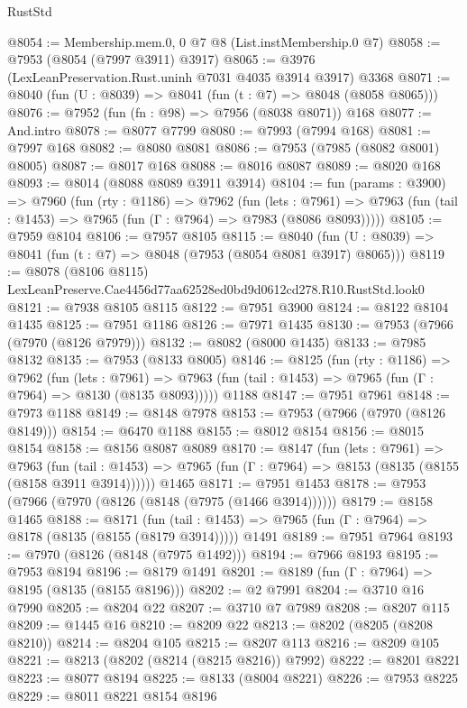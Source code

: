 \begin{lexlean}{RustStd}
\begin{coremodule}
@8054 := Membership.mem.{0, 0} @7 @8 (List.instMembership.{0} @7)
@8058 := @7953 (@8054 (@7997 @3911) @3917)
@8065 := @3976 (LexLeanPreservation.Rust.uninh @7031 @4035 @3914 @3917) @3368
@8071 := @8040 (fun (U : @8039) => @8041 (fun (t : @7) => @8048 (@8058 @8065)))
@8076 := @7952 (fun (fn : @98) => @7956 (@8038 @8071)) @168
@8077 := And.intro
@8078 := @8077 @7799
@8080 := @7993 (@7994 @168)
@8081 := @7997 @168
@8082 := @8080 @8081
@8086 := @7953 (@7985 (@8082 @8001) @8005)
@8087 := @8017 @168
@8088 := @8016 @8087
@8089 := @8020 @168
@8093 := @8014 (@8088 @8089 @3911 @3914)
@8104 := fun (params : @3900) =>
  @7960
    (fun (rty : @1186) =>
    @7962
      (fun (lets : @7961) =>
      @7963 (fun (tail : @1453) => @7965 (fun (Γ : @7964) => @7983 (@8086 @8093)))))
@8105 := @7959 @8104
@8106 := @7957 @8105
@8115 := @8040 (fun (U : @8039) => @8041 (fun (t : @7) => @8048 (@7953 (@8054 @8081 @3917) @8065)))
@8119 := @8078 (@8106 @8115) LexLeanPreserve.Cae4456d77aa62528ed0bd9d0612cd278.R10.RustStd.look0
@8121 := @7938 @8105 @8115
@8122 := @7951 @3900
@8124 := @8122 @8104 @1435
@8125 := @7951 @1186
@8126 := @7971 @1435
@8130 := @7953 (@7966 (@7970 (@8126 @7979)))
@8132 := @8082 (@8000 @1435)
@8133 := @7985 @8132
@8135 := @7953 (@8133 @8005)
@8146 := @8125
    (fun (rty : @1186) =>
    @7962
      (fun (lets : @7961) =>
      @7963 (fun (tail : @1453) => @7965 (fun (Γ : @7964) => @8130 (@8135 @8093)))))
    @1188
@8147 := @7951 @7961
@8148 := @7973 @1188
@8149 := @8148 @7978
@8153 := @7953 (@7966 (@7970 (@8126 @8149)))
@8154 := @6470 @1188
@8155 := @8012 @8154
@8156 := @8015 @8154
@8158 := @8156 @8087 @8089
@8170 := @8147
    (fun (lets : @7961) =>
    @7963
      (fun (tail : @1453) => @7965 (fun (Γ : @7964) => @8153 (@8135 (@8155 (@8158 @3911 @3914))))))
    @1465
@8171 := @7951 @1453
@8178 := @7953 (@7966 (@7970 (@8126 (@8148 (@7975 (@1466 @3914))))))
@8179 := @8158 @1465
@8188 := @8171
    (fun (tail : @1453) => @7965 (fun (Γ : @7964) => @8178 (@8135 (@8155 (@8179 @3914)))))
    @1491
@8189 := @7951 @7964
@8193 := @7970 (@8126 (@8148 (@7975 @1492)))
@8194 := @7966 @8193
@8195 := @7953 @8194
@8196 := @8179 @1491
@8201 := @8189 (fun (Γ : @7964) => @8195 (@8135 (@8155 @8196)))
@8202 := @2 @7991
@8204 := @3710 @16 @7990
@8205 := @8204 @22
@8207 := @3710 @7 @7989
@8208 := @8207 @115
@8209 := @1445 @16
@8210 := @8209 @22
@8213 := @8202 (@8205 (@8208 @8210))
@8214 := @8204 @105
@8215 := @8207 @113
@8216 := @8209 @105
@8221 := @8213 (@8202 (@8214 (@8215 @8216)) @7992)
@8222 := @8201 @8221
@8223 := @8077 @8194
@8225 := @8133 (@8004 @8221)
@8226 := @7953 @8225
@8229 := @8011 @8221 @8154 @8196

\end{coremodule}
\end{lexlean}
